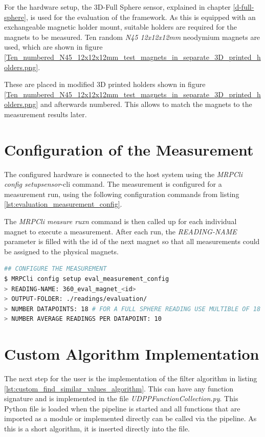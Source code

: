 For the hardware setup, the 3D-Full Sphere sensor, explained in chapter
\ref{d-full-sphere}, is used for the evaluation of the framework. As
this is equipped with an exchangeable magnetic holder mount, suitable
holders are required for the magnets to be measured. Ten random
\emph{N45 12x12x12mm} neodymium magnets are used, which are shown in
figure
\ref{Ten_numbered_N45_12x12x12mm_test_magnets_in_separate_3D_printed_holders.png}.

These are placed in modified 3D printed holders shown in figure
\ref{Ten_numbered_N45_12x12x12mm_test_magnets_in_separate_3D_printed_holders.png}
and afterwards numbered. This allows to match the magnets to the
measurement results later.

\hypertarget{configuration-of-the-measurement}{%
\section{Configuration of the
Measurement}\label{configuration-of-the-measurement}}

The configured hardware is connected to the host system using the
\emph{MRPCli config setupsensor}-\gls{cli} command. The measurement is
configured for a measurement run, using the following configuration
commands from listing \ref{lst:evaluation_measurement_config}.

The \emph{MRPCli measure ruxn} command is then called up for each
individual magnet to execute a measurement. After each run, the
\emph{READING-NAME} parameter is filled with the id of the next magnet
so that all measurements could be assigned to the physical magnets.

\begin{lstlisting}[language=bash, caption={Measurement configuration for evaluation measurement}, label=lst:evaluation_measurement_config]
## CONFIGURE THE MEASUREMENT
$ MRPCli config setup eval_measurement_config
> READING-NAME: 360_eval_magnet_<id>
> OUTPUT-FOLDER: ./readings/evaluation/ 
> NUMBER DATAPOINTS: 18 # FOR A FULL SPHERE READING USE MULTIBLE OF 18
> NUMBER AVERAGE READINGS PER DATAPOINT: 10
\end{lstlisting}

\hypertarget{custom-algorithm-implementation}{%
\section{Custom Algorithm
Implementation}\label{custom-algorithm-implementation}}

The next step for the user is the implementation of the filter algorithm
in listing \ref{lst:custom_find_similar_values_algorithm}. This can have
any function signature and is implemented in the file
\emph{UDPPFunctionCollection.py}. This Python file is loaded when the
pipeline is started and all functions that are imported as a module or
implemented directly can be called via the pipeline. As this is a short
algorithm, it is inserted directly into the file.

